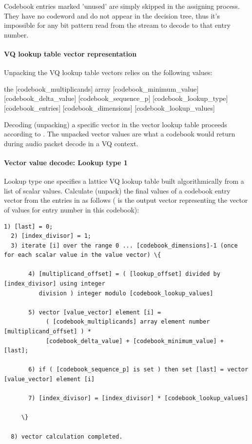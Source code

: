 Codebook entries marked 'unused' are simply skipped in the assigning
process.  They have no codeword and do not appear in the decision
tree, thus it's impossible for any bit pattern read from the stream to
decode to that entry number.



\paragraph{VQ lookup table vector representation}

Unpacking the VQ lookup table vectors relies on the following values:
\begin{programlisting}
the [codebook_multiplicands] array
[codebook_minimum_value]
[codebook_delta_value]
[codebook_sequence_p]
[codebook_lookup_type]
[codebook_entries]
[codebook_dimensions]
[codebook_lookup_values]
\end{programlisting}

\bigskip

Decoding (unpacking) a specific vector in the vector lookup table
proceeds according to .  The unpacked
vector values are what a codebook would return during audio packet
decode in a VQ context.

\paragraph{Vector value decode: Lookup type 1}

Lookup type one specifies a lattice VQ lookup table built
algorithmically from a list of scalar values.  Calculate (unpack) the
final values of a codebook entry vector from the entries in
 as follows (
is the output vector representing the vector of values for entry number
 in this codebook):

\begin{Verbatim}[commandchars=\\\{\}]
  1) [last] = 0;
  2) [index_divisor] = 1;
  3) iterate [i] over the range 0 ... [codebook_dimensions]-1 (once for each scalar value in the value vector) \{

       4) [multiplicand_offset] = ( [lookup_offset] divided by [index_divisor] using integer
          division ) integer modulo [codebook_lookup_values]

       5) vector [value_vector] element [i] =
            ( [codebook_multiplicands] array element number [multiplicand_offset] ) *
            [codebook_delta_value] + [codebook_minimum_value] + [last];

       6) if ( [codebook_sequence_p] is set ) then set [last] = vector [value_vector] element [i]

       7) [index_divisor] = [index_divisor] * [codebook_lookup_values]

     \}

  8) vector calculation completed.
\end{Verbatim}



